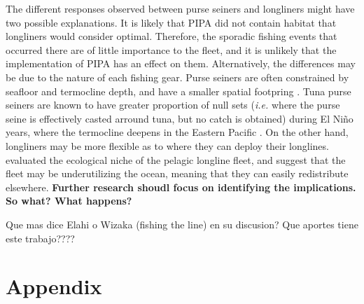 \documentclass[12pt,]{article}
\begin{document}
The different responses observed between purse seiners and longliners
might have two possible explanations. It is likely that PIPA did not
contain habitat that longliners would consider optimal. Therefore, the
sporadic fishing events that occurred there are of little importance to
the fleet, and it is unlikely that the implementation of PIPA has an
effect on them. Alternatively, the differences may be due to the nature
of each fishing gear. Purse seiners are often constrained by seafloor
and termocline depth, and have a smaller spatial footpring
\citep{kroodsma_2018}. Tuna purse seiners are known to have greater
proportion of null sets (\emph{i.e.} where the purse seine is
effectively casted arround tuna, but no catch is obtained) during El
Niño years, where the termocline deepens in the Eastern Pacific
\citep{dreyfusleon_2015}. On the other hand, longliners may be more
flexible as to where they can deploy their longlines.
\citet{ortuocrespo_2018} evaluated the ecological niche of the pelagic
longline fleet, and suggest that the fleet may be underutilizing the
ocean, meaning that they can easily redistribute elsewhere.
\textbf{Further research shoudl focus on identifying the implications.
So what? What happens?}

Que mas dice Elahi o Wizaka (fishing the line) en su discusion? Que
aportes tiene este trabajo????

\clearpage

\section{Appendix}\label{appendix}
\end{document}
